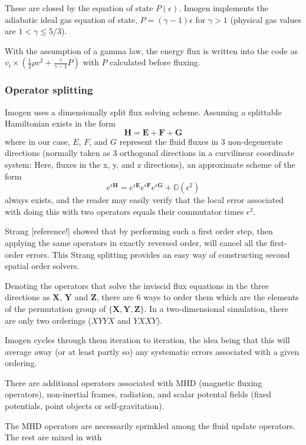 \documentclass[letterpaper,12pt,twocolumn]{article}
\begin{document}
These are closed by the equation of state $P(\epsilon)$. Imogen implements the
adiabatic ideal gas equation of state, $P = (\gamma-1)\epsilon$ for $\gamma > 1$
(physical gas values are $1 < \gamma \le 5/3$).

With the assumption of a gamma law, the energy flux is written into the
code as $v_i \times (\frac{1}{2} \rho v^2 + \frac{\gamma}{\gamma-1}P)$ with $P$ calculated
before fluxing.

\subsubsection{Operator splitting}

Imogen uses a dimensionally split flux solving scheme. Assuming a splittable Hamiltonian
exists in the form
\[\mathbf{H} = \mathbf{E} + \mathbf{F} + \mathbf{G}\]
where in our case, $E$, $F$, and $G$ represent the fluid fluxes in 3 non-degenerate
directions (normally taken as 3 orthogonal directions in a curvilinear coordinate
system: Here, fluxes in the x, y, and z directions), an approximate scheme of the form
\[e^{\epsilon \mathbf{H}} = e^{\epsilon \mathbf{E}} e^{\epsilon \mathbf{F}}
e^{\epsilon \mathbf{G}} + \mathbb{O}(\epsilon^2) \]
always exists, and the reader may easily verify that the local error associated with
doing this with two operators equals their commutator times $\epsilon^2$.

Strang [reference!] showed that by performing such a first order step, then
applying the same operators in exactly reversed order, will cancel all the first-order
errors. This Strang splitting provides an easy way of constructing second spatial order
solvers.

Denoting the operators that solve the inviscid flux equations in the three directions as
$\mathbf{X}$, $\mathbf{Y}$ and $\mathbf{Z}$, there are 6 ways to order them which are the
elements of the permutation group of $\{ \mathbf{X}, \mathbf{Y}, \mathbf{Z} \}$.
In a two-dimensional simulation, there are only two orderings ($XYYX$ and $YXXY$).

Imogen cycles through them iteration to iteration, the idea being that this will average
away (or at least partly so) any systematic errors associated with a given ordering.

There are additional operators associated with MHD (magnetic fluxing operators), non-inertial
frames, radiation, and scalar potental fields (fixed potentials, point objects or
self-gravitation).

The MHD operators are necessarily sprinkled among the fluid update operators. The rest
are mixed in with
\end{document}
